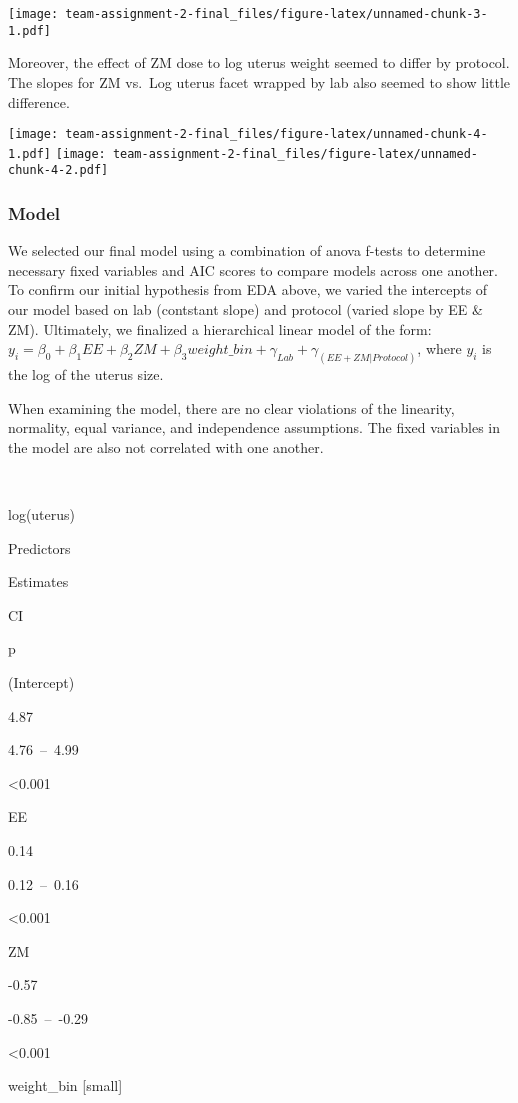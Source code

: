 \documentclass[
]{article}
\begin{document}
\texttt{[image: team-assignment-2-final\_files/figure-latex/unnamed-chunk-3-1.pdf]}

Moreover, the effect of ZM dose to log uterus weight seemed to differ by
protocol. The slopes for ZM vs.~Log uterus facet wrapped by lab also
seemed to show little difference.

\texttt{[image: team-assignment-2-final\_files/figure-latex/unnamed-chunk-4-1.pdf]}
\texttt{[image: team-assignment-2-final\_files/figure-latex/unnamed-chunk-4-2.pdf]}

\hypertarget{model}{%
\subsubsection{Model}\label{model}}

We selected our final model using a combination of anova f-tests to
determine necessary fixed variables and AIC scores to compare models
across one another. To confirm our initial hypothesis from EDA above, we
varied the intercepts of our model based on lab (contstant slope) and
protocol (varied slope by EE \& ZM). Ultimately, we finalized a
hierarchical linear model of the form:
\(y_{i} = \beta_{0} + \beta_{1}EE + \beta_{2}ZM + \beta_{3}weight\_bin + \gamma_{Lab} + \gamma_{(EE+ZM|Protocol)}\),
where \(y_{i}\) is the log of the uterus size.

When examining the model, there are no clear violations of the
linearity, normality, equal variance, and independence assumptions. The
fixed variables in the model are also not correlated with one another.

~

log(uterus)

Predictors

Estimates

CI

p

(Intercept)

4.87

4.76~--~4.99

\textless0.001

EE

0.14

0.12~--~0.16

\textless0.001

ZM

-0.57

-0.85~--~-0.29

\textless0.001

weight\_bin {[}small{]}
\end{document}

